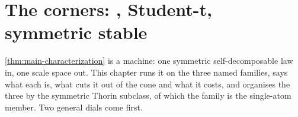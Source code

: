 %
%
%
%

\chapter{The corners: \Matern{}, Student-t, symmetric stable}
\label{ch:corners}

\ref{thm:main-characterization} is a machine: one symmetric self-decomposable law in, one scale
space out. This chapter runs it on the three named families, says what each is, what cuts it
out of the cone and what it costs, and organises the three by the symmetric Thorin subclass, of
which the \Matern{} family is the single-atom member. Two general dials come first.

